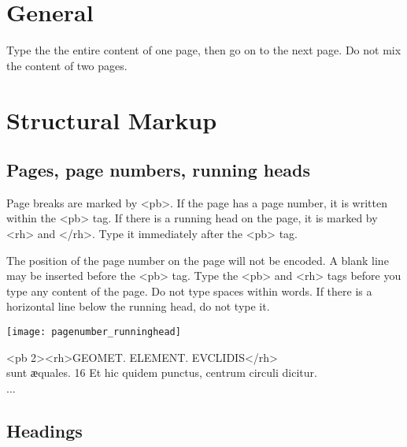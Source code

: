  
\section{General}

Type the the entire content of one page, then go on to the next page. Do not mix the content of two pages.

\section{Structural Markup}

\subsection{Pages, page numbers, running heads}

\begin{mainrule}
Page breaks are marked by <pb>. If the page has a page number, it is written within the <pb> tag. If there is a running head on the page, it is marked by <rh> and </rh>. Type it immediately after the <pb> tag. 
\end{mainrule}

\begin{clarification}
The position of the page number on the page will not be encoded.
A blank line may be inserted before the <pb> tag. 
Type the <pb> and <rh> tags before you type any content of the page.
Do not type spaces within words.
If there is a horizontal line below the running head, do not type it.
\end{clarification}

\begin{example}

\texttt{[image: pagenumber\_runninghead]} 

\begin{typeLatin}
<pb 2><rh>GEOMET. ELEMENT. EVCLIDIS</rh> \\
sunt ӕquales. 16 Et hic quidem punctus, centrum circuli dicitur. \\
...
\end{typeLatin}

\end{example}

\subsection{Headings}

